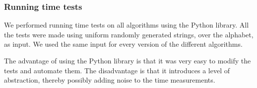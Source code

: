 \subsubsection{Running time tests}\label{sec:runningtimetests}
We performed running time tests on all algorithms using the Python library. All the tests were made using uniform randomly generated strings, over the alphabet, as input. We used the same input for every version of the different algorithms.

The advantage of using the Python library is that it was very easy to modify the tests and automate them. The disadvantage is that it introduces a level of abstraction, thereby possibly adding noise to the time measurements.





